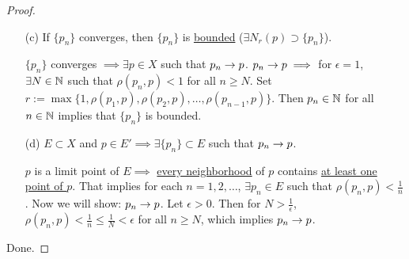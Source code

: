 \documentclass[]{article}
\begin{document}
\begin{proof}
\begin{enumerate}
		\item[(c)] If $\{p_n\}$ converges, then $\{p_n\}$ is \ul{bounded} ($\exists N_r(p) \supset \{ p_n\}$).

			$\{p_n\}$ converges $\implies \exists p\in X$ such that $p_n\rightarrow p$.
			$p_n\rightarrow p \implies$ for $\epsilon = 1$, $\exists N\in\mathbb{N}$ such that $\rho(p_n,p) < 1$ for all $n\geq N$.
			Set $r:= \max\{1,\rho(p_1,p),\rho(p_2,p),\dots,\rho(p_{n-1},p)\}$.
			Then $p_n\in\mathbb{N}$ for all $n\in\mathbb{N}$ implies that $ \{p_n\}$ is bounded.

		\item[(d)] $E\subset X$ and $p\in E' \implies \exists \{p_n\}\subset E$ such that $p_n\rightarrow p$.
			
			$p$ is a limit point of $E \implies$ \ul{every neighborhood} of $p$ contains \ul{at least one point of $p$}.
			That implies for each $n = 1,2,\dots$, $\exists p_n\in E$ such that $\rho(p_n,p) < \frac{1}{n}$. Now we will show: $p_n\rightarrow p$.
			Let $\epsilon > 0$. Then for $N > \frac{1}{\epsilon}$, $\rho(p_n,p) < \frac{1}{n} \leq \frac{1}{N} < \epsilon$ for all $n\geq N$, which implies $p_n\rightarrow p$.
	\end{enumerate}
	Done.
\end{proof}
\end{document}
